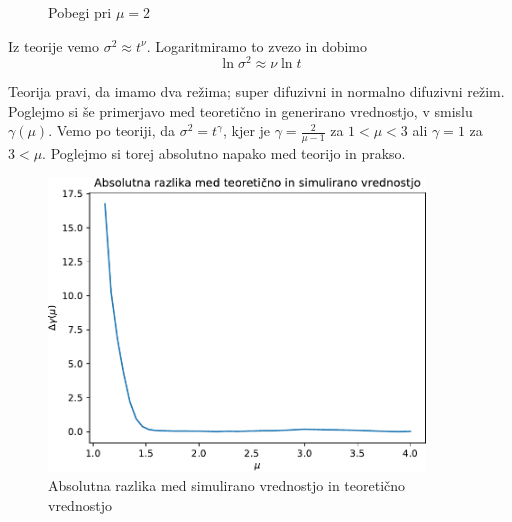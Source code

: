 \begin{figure}[h]
    \begin{center}
    \end{center}
    \caption{Pobegi pri $\mu = 2$}
\end{figure}

Iz teorije vemo $\sigma^2 \approx t^\nu$. Logaritmiramo to zvezo in dobimo
\begin{equation}
    \ln \sigma^2 \approx \nu \ln t
\end{equation}

Teorija pravi, da imamo dva režima; super difuzivni in normalno difuzivni režim.
Poglejmo si še primerjavo med teoretično in generirano vrednostjo, v smislu $\gamma(\mu)$.
Vemo po teoriji, da $\sigma^2 = t^\gamma$, kjer je $\gamma = \frac{2}{\mu - 1}$ za $1<\mu<3$ 
ali $\gamma = 1$ za $3<\mu$. Poglejmo si torej absolutno napako med teorijo in prakso.
\newpage
\begin{figure}[h]
    \centering
    \includegraphics[width=100mm]{pdfs/flights.pdf}
    \caption{Absolutna razlika med simulirano vrednostjo in teoretično vrednostjo}
\end{figure}

